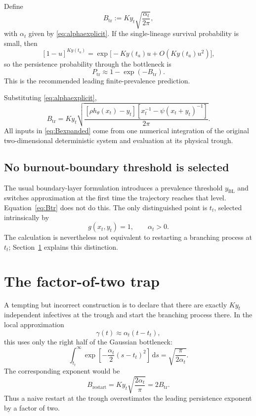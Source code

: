 \documentclass[11pt]{article}
\newcommand{\hth}{h_\theta}
\newcommand{\dd}{\,\mathrm d}
\newcommand{\gam}{\gamma}
\newcommand{\Ptr}{P_{\mathrm{tr}}}
\begin{document}
Define
\begin{equation}
\boxed{
B_{\mathrm{tr}}
:=K y_t\sqrt{\frac{\alpha_t}{2\pi}},}
\label{eq:Btr}
\end{equation}
with \(\alpha_t\) given by \eqref{eq:alphaexplicit}. If the single-lineage survival probability is small, then
\[
[1-u]^{Ky(t_a)}
=\exp\bigl[-Ky(t_a)u+O(Ky(t_a)u^2)\bigr],
\]
so the persistence probability through the bottleneck is
\begin{equation}
\boxed{
\Ptr
\approx
1-\exp(-B_{\mathrm{tr}}).}
\label{eq:Ptr}
\end{equation}
This is the recommended leading finite-prevalence prediction.

Substituting \eqref{eq:alphaexplicit},
\begin{equation}
\boxed{
B_{\mathrm{tr}}
=K y_t
\sqrt{
\frac{
[\rho\hth(x_t)-y_t]
\left[x_t^{-1}-\psi(x_t+y_t)^{-1}\right]
}{2\pi}
}.}
\label{eq:Bexpanded}
\end{equation}
All inputs in \eqref{eq:Bexpanded} come from one numerical integration of the original two-dimensional deterministic system and evaluation at its physical trough.

\subsection{No burnout-boundary threshold is selected}

The usual boundary-layer formulation introduces a prevalence threshold \(y_{\mathrm{BL}}\) and switches approximation at the first time the trajectory reaches that level. Equation~\eqref{eq:Btr} does not do this. The only distinguished point is \(t_t\), selected intrinsically by
\[
 g(x_t,y_t)=1,
\qquad
\alpha_t>0.
\]
The calculation is nevertheless not equivalent to restarting a branching process at \(t_t\); Section~\ref{sec:factor2} explains this distinction.

\section{The factor-of-two trap}\label{sec:factor2}

A tempting but incorrect construction is to declare that there are exactly \(K y_t\) independent infectives at the trough and start the branching process there. In the local approximation
\[
\gam(t)\approx\alpha_t(t-t_t),
\]
this uses only the right half of the Gaussian bottleneck:
\begin{equation}
\int_{t_t}^{\infty}
\exp\left[-\frac{\alpha_t}{2}(s-t_t)^2\right]\dd s
=\sqrt{\frac{\pi}{2\alpha_t}}.
\end{equation}
The corresponding exponent would be
\[
B_{\mathrm{restart}}
=K y_t\sqrt{\frac{2\alpha_t}{\pi}}
=2B_{\mathrm{tr}}.
\]
Thus a naive restart at the trough overestimates the leading persistence exponent by a factor of two.
\end{document}
